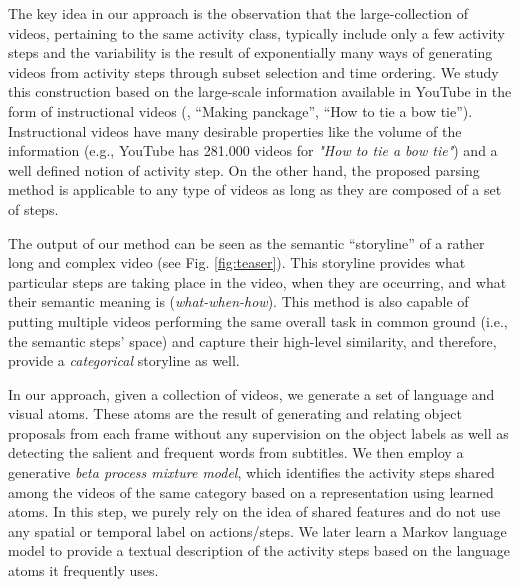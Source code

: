 
The key idea in our approach is the observation that the large-collection of videos, pertaining to the same activity class, typically include only a few activity steps and the variability is the result of exponentially many ways of generating videos from activity steps through subset selection and time ordering. We study this construction based on the large-scale information available in YouTube in the form of instructional videos  (\eg, ``Making panckage'', ``How to tie a bow tie''). Instructional videos have many desirable properties like the volume of the information (e.g., YouTube has 281.000 videos for \emph{"How to tie a bow tie"}) and a well defined notion of activity step.  On the other hand, the proposed parsing method is applicable to any type of videos as long as they are composed of a set of steps.

The output of our method can be seen as the semantic ``storyline'' of a rather long and complex video (see Fig. \ref{fig:teaser}). This storyline provides what particular steps are taking place in the video, when they are occurring, and what their semantic meaning is (\emph{what-when-how}). This method is also capable of putting multiple videos performing the same overall task in common ground (i.e., the semantic steps’ space) and capture their high-level similarity, and therefore, provide a \emph{categorical} storyline as well.

In our approach, given a collection of videos, we generate a set of language and visual atoms. These atoms are the result of generating and relating object proposals from each frame without any supervision on the object labels as well as detecting the salient and frequent words from subtitles. We then employ a generative \emph{beta process mixture model}, which identifies the activity steps shared among the videos of the same category based on a representation using learned atoms. In this step, we purely rely on the idea of shared features and do not use any spatial or temporal label on actions/steps. We later learn a Markov language model to provide a textual description of the activity steps based on the language atoms it frequently uses.

